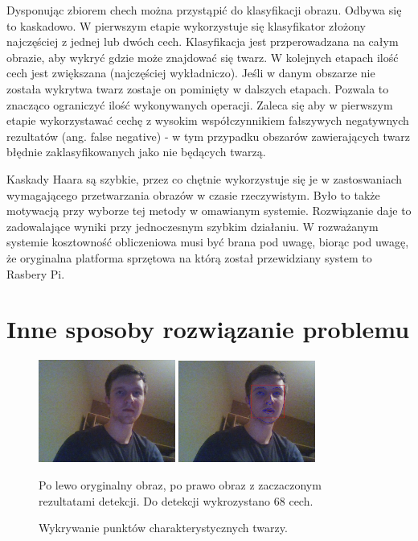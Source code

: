 \documentclass[oneside, eng]{mgr}
\begin{document}
Dysponując zbiorem chech można przystąpić do klasyfikacji obrazu. Odbywa się to kaskadowo. W pierwszym etapie wykorzystuje się klasyfikator złożony najczęściej z jednej lub dwóch cech. Klasyfikacja jest przperowadzana na całym obrazie, aby wykryć gdzie może znajdować się twarz. W kolejnych etapach ilość cech jest zwiększana (najczęściej wykładniczo). Jeśli w danym obszarze nie została wykrytwa twarz zostaje on pominięty w dalszych etapach. Pozwala to znacząco ograniczyć ilość wykonywanych operacji. Zaleca się aby w pierwszym etapie wykorzystawać cechę z wysokim współczynnikiem fałszywych negatywnych rezultatów (ang. false negative) - w tym przypadku obszarów zawierających twarz błędnie zaklasyfikowanych jako nie będących twarzą.

Kaskady Haara są szybkie, przez co chętnie wykorzystuje się je w zastoswaniach wymagającego przetwarzania obrazów w czasie rzeczywistym. Było to także motywacją przy wyborze tej metody w omawianym systemie. Rozwiązanie daje to zadowalające wyniki przy jednoczesnym szybkim działaniu. W rozważanym systemie kosztowność obliczeniowa musi być brana pod uwagę, biorąc pod uwagę, że oryginalna platforma sprzętowa na którą został przewidziany system to Rasbery Pi.

\section{Inne sposoby rozwiązanie problemu}

\begin{figure}
\centering
	\includegraphics[width=0.40\textwidth,natwidth=310,natheight=642]{test.jpg}
	\includegraphics[width=0.40\textwidth,natwidth=310,natheight=642]{test_result.jpg}
\caption{Wykrywanie punktów charakterystycznych twarzy.}
Po lewo oryginalny obraz, po prawo obraz z zaczaczonym rezultatami detekcji. Do detekcji wykrozystano 68 cech.
	\label{fig:face_landmark_detect}
\end{figure}
\end{document}
